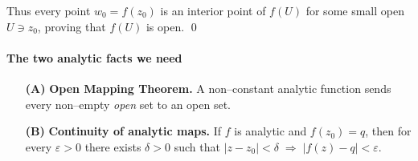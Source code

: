 \documentclass[12pt]{article}
\theoremstyle{definition} %
\theoremstyle{plain} %
\begin{document}
        \noindent
        Thus every point $w_{0}=f(z_{0})$ is an interior point of $f(U)$ for some
        small open $U\ni z_{0}$, proving that $f(U)$ is open.
        \qed
        \paragraph{The two analytic facts we need}

\begin{enumerate}
   \item[\textbf{(A)}] \textbf{Open Mapping Theorem.}\;
         A non–constant analytic function sends every non–empty \emph{open}
         set to an open set.

   \item[\textbf{(B)}] \textbf{Continuity of analytic maps.}\;
         If $f$ is analytic and $f(z_{0})=q$, then for every
         $\varepsilon>0$ there exists $\delta>0$ such that
         $|z-z_{0}|<\delta\;\Longrightarrow\;|f(z)-q|<\varepsilon$.
\end{enumerate}
\end{document}
